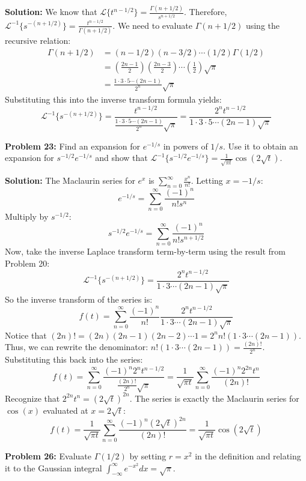 \documentclass[11pt, letterpaper]{article}
\theoremstyle{definition}
\theoremstyle{remark}
\begin{document}
\textbf{Solution:}
We know that $\mathcal{L}\{t^{n-1/2}\} = \frac{\Gamma(n+1/2)}{s^{n+1/2}}$. Therefore, $\mathcal{L}^{-1}\{s^{-(n+1/2)}\} = \frac{t^{n-1/2}}{\Gamma(n+1/2)}$.
We need to evaluate $\Gamma(n+1/2)$ using the recursive relation:
\begin{align*}
    \Gamma(n+1/2) &= (n-1/2)(n-3/2) \cdots (1/2) \Gamma(1/2) \\
    &= \left(\frac{2n-1}{2}\right) \left(\frac{2n-3}{2}\right) \cdots \left(\frac{1}{2}\right) \sqrt{\pi} \\
    &= \frac{1 \cdot 3 \cdot 5 \cdots (2n-1)}{2^n} \sqrt{\pi}
\end{align*}
Substituting this into the inverse transform formula yields:
\[ \mathcal{L}^{-1}\{s^{-(n+1/2)}\} = \frac{t^{n-1/2}}{\frac{1 \cdot 3 \cdot 5 \cdots (2n-1)}{2^n} \sqrt{\pi}} = \frac{2^n t^{n-1/2}}{1 \cdot 3 \cdot 5 \cdots (2n-1) \sqrt{\pi}} \]

\vspace{1em}
\textbf{Problem 23:} Find an expansion for $e^{-1/s}$ in powers of $1/s$. Use it to obtain an expansion for $s^{-1/2}e^{-1/s}$ and show that $\mathcal{L}^{-1}\{s^{-1/2}e^{-1/s}\} = \frac{1}{\sqrt{\pi t}} \cos(2\sqrt{t})$.

\textbf{Solution:}
The Maclaurin series for $e^x$ is $\sum_{n=0}^\infty \frac{x^n}{n!}$. Letting $x = -1/s$:
\[ e^{-1/s} = \sum_{n=0}^\infty \frac{(-1)^n}{n! s^n} \]
Multiply by $s^{-1/2}$:
\[ s^{-1/2} e^{-1/s} = \sum_{n=0}^\infty \frac{(-1)^n}{n! s^{n+1/2}} \]
Now, take the inverse Laplace transform term-by-term using the result from Problem 20:
\[ \mathcal{L}^{-1}\{s^{-(n+1/2)}\} = \frac{2^n t^{n-1/2}}{1 \cdot 3 \cdots (2n-1) \sqrt{\pi}} \]
So the inverse transform of the series is:
\[ f(t) = \sum_{n=0}^\infty \frac{(-1)^n}{n!} \frac{2^n t^{n-1/2}}{1 \cdot 3 \cdots (2n-1) \sqrt{\pi}} \]
Notice that $(2n)! = (2n)(2n-1)(2n-2) \cdots 1 = 2^n n! (1 \cdot 3 \cdots (2n-1))$.
Thus, we can rewrite the denominator: $n! (1 \cdot 3 \cdots (2n-1)) = \frac{(2n)!}{2^n}$.
Substituting this back into the series:
\[ f(t) = \sum_{n=0}^\infty \frac{(-1)^n 2^n t^{n-1/2}}{\frac{(2n)!}{2^n} \sqrt{\pi}} = \frac{1}{\sqrt{\pi t}} \sum_{n=0}^\infty \frac{(-1)^n 2^{2n} t^n}{(2n)!} \]
Recognize that $2^{2n} t^n = (2\sqrt{t})^{2n}$. The series is exactly the Maclaurin series for $\cos(x)$ evaluated at $x = 2\sqrt{t}$:
\[ f(t) = \frac{1}{\sqrt{\pi t}} \sum_{n=0}^\infty \frac{(-1)^n (2\sqrt{t})^{2n}}{(2n)!} = \frac{1}{\sqrt{\pi t}} \cos(2\sqrt{t}) \]

\vspace{1em}
\textbf{Problem 26:} Evaluate $\Gamma(1/2)$ by setting $r = x^2$ in the definition and relating it to the Gaussian integral $\int_{-\infty}^\infty e^{-x^2} dx = \sqrt{\pi}$.
\end{document}
